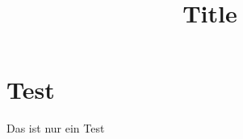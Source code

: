 \documentclass[12pt,a4paper]{scrartcl}
\title{Title}
\begin{document}
    \maketitle
    \newpage

    \tableofcontents
    \pagebreak

    \section{Test}\label{sec:test}
    Das ist nur ein Test
\end{document}
